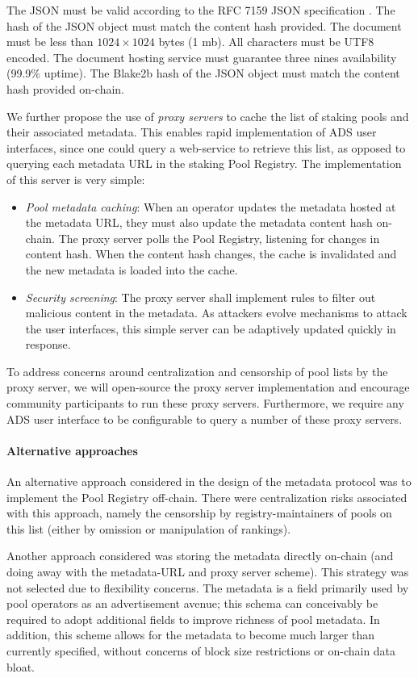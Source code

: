 The JSON must be valid according to the RFC 7159 JSON specification \cite{rfc7159}. The hash of the JSON object must match the content hash provided. The document must be less than $1024\times1024$ bytes (1 mb). All characters must be UTF8 encoded. The document hosting service must guarantee three nines availability (99.9\% uptime). The Blake2b hash of the JSON object must match the content hash provided on-chain. 

We further propose the use of \textit{proxy servers} to cache the list of staking pools and their associated metadata. This enables rapid implementation of ADS user interfaces, since one could query a web-service to retrieve this list, as opposed to querying each metadata URL in the staking Pool Registry. The implementation of this server is very simple:
\begin{itemize}
    \item \textit{Pool metadata caching}: When an operator updates the metadata hosted at the metadata URL, they must also update the metadata content hash on-chain. The proxy server polls the Pool Registry, listening for changes in content hash. When the content hash changes, the cache is invalidated and the new metadata is loaded into the cache. 
    \item \textit{Security screening}: The proxy server shall implement rules to filter out malicious content in the metadata. As attackers evolve mechanisms to attack the user interfaces, this simple server can be adaptively updated quickly in response. 
\end{itemize}

To address concerns around centralization and censorship of pool lists by the proxy server, we will open-source the proxy server implementation and encourage community participants to run these proxy servers. Furthermore, we require any ADS user interface to be configurable to query a number of these proxy servers.

\paragraph{Alternative approaches} An alternative approach considered in the design of the metadata protocol was to implement the Pool Registry off-chain. There were centralization risks associated with this approach, namely the censorship by registry-maintainers of pools on this list (either by omission or manipulation of rankings). 

Another approach considered was storing the metadata directly on-chain (and doing away with the metadata-URL and proxy server scheme). This strategy was not selected due to flexibility concerns. The metadata is a field primarily used by pool operators as an advertisement avenue; this schema can conceivably be required to adopt additional fields to improve richness of pool metadata. In addition, this scheme allows for the metadata to become much larger than currently specified, without concerns of block size restrictions or on-chain data bloat. 

